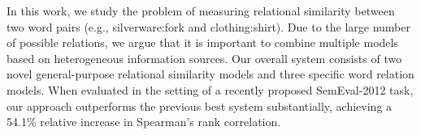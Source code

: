 In this work, we study the problem of measuring relational similarity between two word pairs (e.g., silverware:fork and clothing:shirt). Due to the large
 number of possible relations, we argue that it is important to combine multiple
 models based on heterogeneous information sources. Our overall system consists
 of two novel general-purpose relational similarity models and three specific
 word relation models. When evaluated in the setting of a recently proposed
 SemEval-2012 task, our approach outperforms the previous best system
 substantially, achieving a 54.1\% relative increase in Spearman's rank
 correlation.

